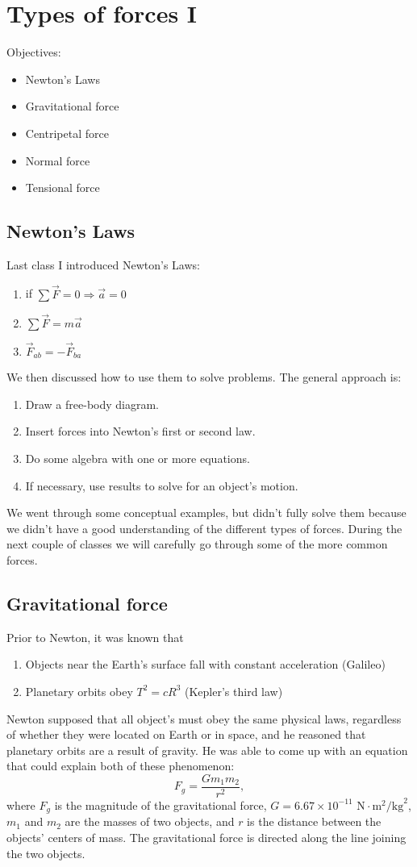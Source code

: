 \section{Types of forces I}
Objectives:
\begin{itemize}
\item Newton's Laws
\item Gravitational force
\item Centripetal force
\item Normal force
\item Tensional force
\end{itemize}

\subsection{Newton's Laws}
Last class I introduced Newton's Laws:
\begin{enumerate}
\item if $\sum\vec{F}=0\Rightarrow \vec{a}=0$
\item $\sum\vec{F}=m\vec{a}$
\item $\vec{F}_{ab}=-\vec{F}_{ba}$
\end{enumerate}
We then discussed how to use them to solve problems. The general approach is:
\begin{enumerate}
\item Draw a free-body diagram.
\item Insert forces into Newton's first or second law.
\item Do some algebra with one or more equations.
\item If necessary, use results to solve for an object's motion.
\end{enumerate}
We went through some conceptual examples, but didn't fully solve them because we didn't have a good understanding of the different types of forces. During the next couple of classes we will carefully go through some of the more common forces.

\subsection{Gravitational force}
Prior to Newton, it was known that
\begin{enumerate}
\item Objects near the Earth's surface fall with constant acceleration (Galileo)
\item Planetary orbits obey $T^2=cR^3$ (Kepler's third law)
\end{enumerate}
Newton supposed that all object's must obey the same physical laws, regardless of whether they were located on Earth or in space, and he reasoned that planetary orbits are a result of gravity. He was able to come up with an equation that could explain both of these phenomenon:
$$\boxed{F_g=\frac{Gm_1m_2}{r^2}},$$
where $F_g$ is the magnitude of the gravitational force, $G=6.67\times10^{-11}\mbox{ N}\cdot\mbox{m}^2\mbox{/kg}^2$, $m_1$ and $m_2$ are the masses of two objects, and $r$ is the distance between the objects' centers of mass. The gravitational force is directed along the line joining the two objects.

